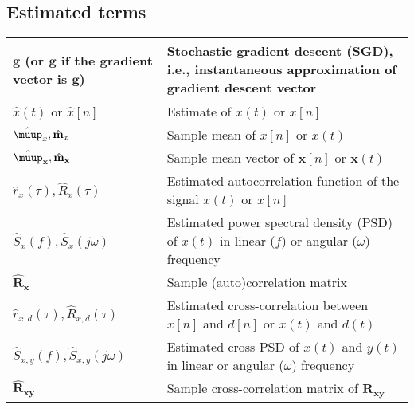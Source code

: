 \documentclass{article}
\begin{document}
\subsection{Estimated terms}
\begin{xltabular}{\textwidth}{XX}
    \(\mathbf{g}\) (or \(\hat{\mathbf{g}}\) if the gradient vector is \(\mathbf{g}\))                               & Stochastic gradient descent (SGD), i.e., instantaneous approximation of gradient descent vector \\ \hline
    \(\hat{x}(t)\) or \(\hat{x}[n]\)                                                                                & Estimate of \(x(t)\) or \(x[n]\)\\ \hline
    \(\hat{\boldsymbol{\muup}}_x, \hat{\mathbf{m}}_x\)                                                              & Sample mean of \(x[n]\) or \(x(t)\) \\ \hline
    \(\hat{\boldsymbol{\muup}}_\mathbf{x}, \hat{\mathbf{m}}_\mathbf{x}\)                                            & Sample mean vector of \(\mathbf{x}[n]\) or \(\mathbf{x}(t)\)\\ \hline
    \(\hat{r}_x(\tau), \hat{R}_x(\tau)\)                                                                            & Estimated autocorrelation function of the signal \(x(t)\) or \(x[n]\)\\ \hline
    \(\hat{S}_x(f), \hat{S}_x(j\omega)\)                                                                            & Estimated power spectral density (PSD) of \(x(t)\) in linear (\(f\)) or angular (\(\omega\)) frequency\\ \hline
    \(\hat{\mathbf{R}}_\mathbf{x}\)                                                                                 & Sample (auto)correlation matrix \\ \hline
    \(\hat{r}_{x,d}(\tau), \hat{R}_{x,d}(\tau)\)                                                                    & Estimated cross-correlation between \(x[n]\) and \(d[n]\) or \(x(t)\) and \(d(t)\)\\ \hline
    \(\hat{S}_{x,y}(f), \hat{S}_{x,y}(j\omega)\)                                                                    & Estimated cross PSD of \(x(t)\) and \(y(t)\) in linear or angular (\(\omega\)) frequency\\ \hline
    \(\hat{\mathbf{R}}_\mathbf{xy}\)                                                                                & Sample cross-correlation matrix of \(\mathbf{R}_\mathbf{xy}\) \\ \hline

\end{xltabular}
\end{document}
